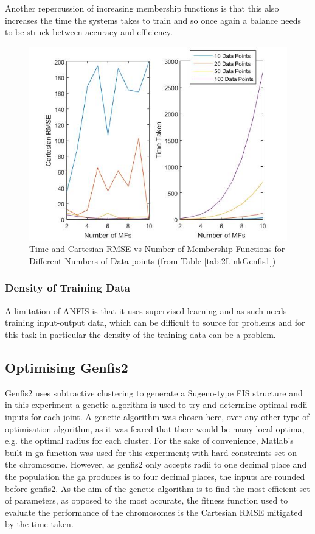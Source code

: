 \documentclass[11.5pt, twoside, a4paper]{article}
\begin{document}
Another repercussion of increasing membership functions is that this also increases the time the systems takes to train and so once again a balance needs to be struck between accuracy and efficiency.

\begin{figure}
\includegraphics[width=\linewidth]{numMFs.jpg}
\caption{Time and Cartesian RMSE vs Number of Membership Functions for Different Numbers of Data points (from Table \ref{tab:2LinkGenfis1})\label{fig:Genfis1}}
\end{figure}

\subsubsection{Density of Training Data}

A limitation of ANFIS is that it uses supervised learning and as such needs training input-output data, which can be difficult to source for problems and for this task in particular the density of the training data can be a problem. 

\subsection{Optimising Genfis2}
Genfis2 uses subtractive clustering to generate a Sugeno-type FIS structure \cite{genfis2} and in this experiment a genetic algorithm is used to try and determine optimal radii inputs for each joint. A genetic algorithm was chosen here, over any other type of optimisation algorithm, as it was feared that there would be many local optima, e.g. the optimal radius for each cluster. For the sake of convenience, Matlab's built in ga function was used for this experiment; with hard constraints set on the chromosome. However, as genfis2 only accepts radii to one decimal place and the population the ga produces is to four decimal places, the inputs are rounded before genfis2. As the aim of the genetic algorithm is to find the most efficient set of parameters, as opposed to the most accurate, the fitness function used to evaluate the performance of the chromosomes is the Cartesian RMSE mitigated by the time taken.
\end{document}
